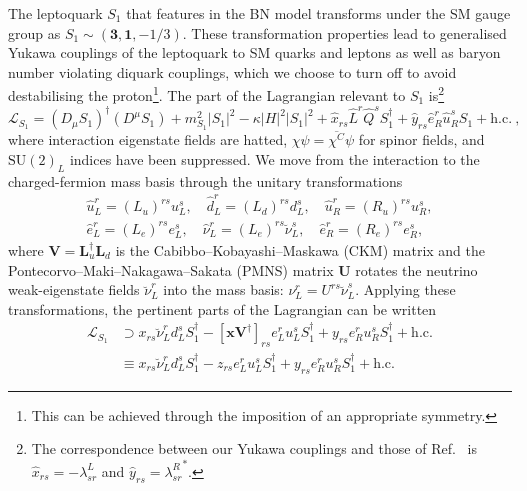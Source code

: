 The leptoquark $S_{1}$ that features in the BN model transforms under the SM
gauge group as $S_{1} \sim (\mathbf{3}, \mathbf{1}, -1/3)$. These transformation
properties lead to generalised Yukawa couplings of the leptoquark to SM quarks
and leptons as well as baryon number violating diquark couplings, which we choose
to turn off to avoid destabilising the proton\footnote{This can be achieved
  through the imposition of an appropriate symmetry.}. The part of the
Lagrangian relevant to $S_{1}$ is\footnote{The correspondence between our Yukawa
  couplings and those of Ref.~\cite{Bauer:2015knc} is
  $\hat{x}_{rs} = -\lambda^L_{sr}$ and $\hat{y}_{rs} = {\lambda^R_{sr}}^{*}$.}
\begin{equation}
  \label{eq:ch3-Lagra}
  \mathscr{L}_{S_{1}} = (D_\mu S_{1})^\dagger (D^\mu S_{1}) + m_{S_1}^2 |S_{1}|^2 - \kappa |H|^2 |S_{1}|^2 + \hat{x}_{rs} \hat{L}^r \hat{Q}^s S_{1}^\dagger
  + \hat{y}_{rs} \hat{e}_R^r \hat{u}_R^s S_{1} + \text{h.c.} \ ,
\end{equation}
where interaction eigenstate fields are hatted,
$\chi \psi = \overline{\chi^C} \psi$ for spinor fields, and $\mathrm{SU}(2)_L$
indices have been suppressed. We move from the interaction to the
charged-fermion mass basis through the unitary transformations
\begin{equation}
  \label{eq:ch3-smfermion-mixing}
  \begin{split}
    \hat{u}_L^r = (L_u)^{rs} u_L^s, \quad \hat{d}_L^r = (L_d)^{rs} d_L^s, \quad \hat{u}^r_R = (R_u)^{rs} u^s_R,\\
    \hat{e}_L^r = (L_e)^{rs} e_L^s, \quad \hat{\nu}_L^r = (L_e)^{rs} \breve{\nu}_L^s, \quad \hat{e}_R^r = (R_e)^{rs} e_R^s,
  \end{split}
\end{equation}
where $\mathbf{V} = \mathbf{L}_u^\dagger \mathbf{L}_d$ is the
Cabibbo--Kobayashi--Maskawa (CKM) matrix and the
Pontecorvo--Maki--Nakagawa--Sakata (PMNS) matrix $\mathbf{U}$ rotates the
neutrino weak-eigenstate fields $\breve{\nu}_L^r$ into the mass basis: $\nu_L^r
= U^{rs} \breve{\nu}_L^s$. Applying these transformations, the pertinent parts
of the Lagrangian can be written
\begin{equation}
  \begin{split}
    \label{eq:ch3-Lagray}
    \mathscr{L}_{S_{1}} &\supset x_{rs} \breve{\nu}_L^r d_L^s S_{1}^\dagger - [\mathbf{x} \mathbf{V}^\dagger]_{rs} e_L^r u_L^s S_{1}^\dagger + y_{rs} e_R^r u_R^s S^{\dagger}_{1} + \text{h.c.}\\
    &\equiv x_{rs} \breve{\nu}_L^r d_L^s S_{1}^\dagger - z_{rs} e_L^r u_L^s S_{1}^\dagger + y_{rs}
    e_R^r u_R^s S^{\dagger}_{1} + \text{h.c.}
  \end{split}
\end{equation}
